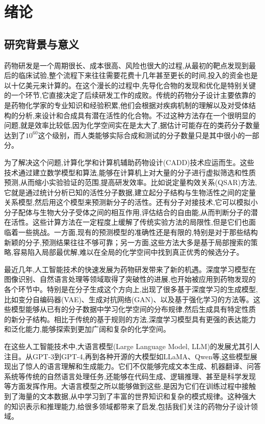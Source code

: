\chapter{绪论}

\section{研究背景与意义}

药物研发是一个周期很长、成本很高、风险也很大的过程,从最初的靶点发现到最后的临床试验,整个流程下来往往需要花费十几年甚至更长的时间,投入的资金也是以十亿美元来计算的\cite{di2019innovation}。在这个漫长的过程中,先导化合物的发现和优化是特别关键的一个环节,它直接决定了后续研发工作的成败。传统的药物分子设计主要依靠的是药物化学家的专业知识和经验积累,他们会根据对疾病机制的理解以及对受体结构的分析,来设计和合成具有潜在活性的化合物。不过这种方法存在一个很明显的问题,就是效率比较低,因为化学空间实在是太大了,据估计可能存在的类药分子数量达到了$10^{60}$这个级别\cite{bohacek1996art}，而人类能够实际合成和测试的分子数量只是其中很小的一部分。

为了解决这个问题,计算化学和计算机辅助药物设计(CADD)技术应运而生。这些技术通过建立数学模型和算法,能够在计算机上对大量的分子进行虚拟筛选和性质预测,从而缩小实验验证的范围,提高研发效率\cite{lyu2019ultra}。比如说定量构效关系(QSAR)方法,它就是通过统计分析已知的活性分子数据,建立起分子结构与生物活性之间的定量关系模型,然后用这个模型来预测新分子的活性\cite{muratov2020qsar}。还有分子对接技术,它可以模拟小分子配体与生物大分子受体之间的相互作用,评估结合的自由能,从而判断分子的潜在活性\cite{meng2011molecular}。这些计算方法在一定程度上缓解了传统实验方法的局限性,但是它们也面临着一些挑战。一方面,现有的预测模型的准确性还是有限的,特别是对于那些结构新颖的分子,预测结果往往不够可靠；另一方面,这些方法大多是基于局部搜索的策略,容易陷入局部最优解,难以在全局的化学空间中找到真正优秀的候选分子。

最近几年,人工智能技术的快速发展为药物研发带来了新的机遇。深度学习模型在图像识别、自然语言处理等领域取得了突破性的进展,也开始被应用到药物发现的各个环节中\cite{chen2018rise}。特别是在分子生成这个方向上,出现了很多基于深度学习的生成模型,比如变分自编码器(VAE)、生成对抗网络(GAN)、以及基于强化学习的方法等\cite{olivecrona2017molecular}。这些模型能够从已有的分子数据中学习化学空间的分布规律,然后生成具有特定性质的新分子结构。相比于传统的基于规则的方法,深度学习模型具有更强的表达能力和泛化能力,能够探索到更加广阔和复杂的化学空间。

在这些人工智能技术中,大语言模型(Large Language Model, LLM)的发展尤其引人注目。从GPT-3到GPT-4,再到各种开源的大模型如LLaMA\cite{touvron2023llama}、Qwen等,这些模型展现出了惊人的语言理解和生成能力\cite{achiam2023gpt}。它们不仅能够完成文本生成、机器翻译、问答系统等传统的自然语言处理任务,还能够在代码生成、逻辑推理、甚至是科学发现等方面发挥作用。大语言模型之所以能够做到这些,是因为它们在训练过程中接触到了海量的文本数据,从中学习到了丰富的世界知识和复杂的模式规律。这种强大的知识表示和推理能力,给很多领域都带来了启发,包括我们关注的药物分子设计领域。

